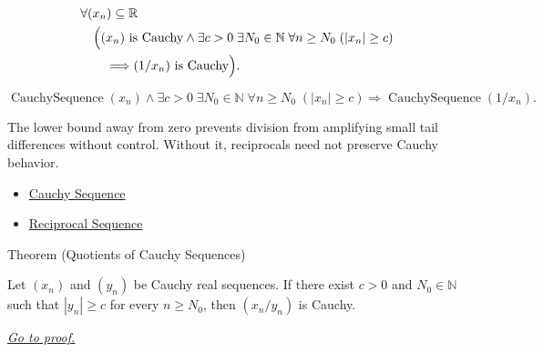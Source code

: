 \begin{remark*}
\[
\begin{aligned}
&\forall (x_n)\subseteq\mathbb{R}\\
&\quad
\Bigl(
  (x_n)\text{ is Cauchy}
  \land
  \exists c>0\;\exists N_0\in\mathbb{N}\;\forall n\ge N_0\;( |x_n|\ge c )\\
&\qquad\Longrightarrow
  (1/x_n)\text{ is Cauchy}
\Bigr).
\end{aligned}
\]
\end{remark*}

\begin{remark*}
\[
\operatorname{CauchySequence}(x_n)
\land
\exists c>0\;\exists N_0\in\mathbb{N}\;\forall n\ge N_0\;( |x_n|\ge c )
\Longrightarrow
\operatorname{CauchySequence}(1/x_n).
\]
\end{remark*}

\begin{remark*}[Interpretation]
The lower bound away from zero prevents division from amplifying small tail
differences without control. Without it, reciprocals need not preserve Cauchy
behavior.
\end{remark*}

\begin{dependencies}
\begin{itemize}
  \item \hyperref[def:cauchy-sequence]{Cauchy Sequence}
  \item \hyperref[def:reciprocal-sequence]{Reciprocal Sequence}
\end{itemize}
\end{dependencies}


\begin{theorembox}{Theorem (Quotients of Cauchy Sequences)}
\begin{theorem}
\label{thm:quotient-cauchy-sequences}
Let $(x_n)$ and $(y_n)$ be Cauchy real sequences. If there exist $c>0$
and $N_0\in\mathbb{N}$ such that $|y_n|\ge c$ for every $n\ge N_0$,
then $(x_n/y_n)$ is Cauchy.

\smallskip
\noindent
\hyperref[prf:quotient-cauchy-sequences]{\textit{Go to proof.}}
\end{theorem}
\end{theorembox}

